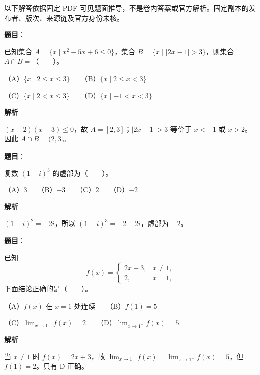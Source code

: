 

\begin{gktip}
以下解答依据固定 PDF 可见题面推导，不是卷内答案或官方解析。固定副本的发布者、版次、来源链及官方身份未核。
\end{gktip}

\begin{answer}

\textbf{题目}：

已知集合 $A=\{x\mid x^2-5x+6\leqslant0\}$，集合 $B=\{x\mid |2x-1|>3\}$，则集合 $A\cap B=$\mbox{（　　）}。

（A）$\{x\mid 2\leqslant x\leqslant3\}$　　（B）$\{x\mid 2\leqslant x<3\}$

（C）$\{x\mid 2<x\leqslant3\}$　　（D）$\{x\mid -1<x<3\}$

\textbf{解析}

$(x-2)(x-3)\leqslant0$，故 $A=[2,3]$；$|2x-1|>3$ 等价于 $x<-1$ 或 $x>2$。因此 $A\cap B=(2,3]$。


\end{answer}
\begin{answer}

\textbf{题目}：

复数 $(1-i)^3$ 的虚部为\mbox{（　　）}。

（A）$3$　　（B）$-3$　　（C）$2$　　（D）$-2$

\textbf{解析}

$(1-i)^2=-2i$，所以 $(1-i)^3=-2-2i$，虚部为 $-2$。


\end{answer}
\begin{answer}

\textbf{题目}：

已知
\nopagebreak[4]
\[
f(x)=
\begin{cases}
2x+3,&x\ne1,\\
2,&x=1,
\end{cases}
\]
下面结论正确的是\mbox{（　　）}。

（A）$f(x)$ 在 $x=1$ 处连续　　（B）$f(1)=5$

（C）$\displaystyle\lim_{x\to1^-}f(x)=2$　　（D）$\displaystyle\lim_{x\to1^+}f(x)=5$

\textbf{解析}

当 $x\ne1$ 时 $f(x)=2x+3$，故 $\lim_{x\to1^-}f(x)=\lim_{x\to1^+}f(x)=5$，但 $f(1)=2$。只有 D 正确。


\end{answer}
